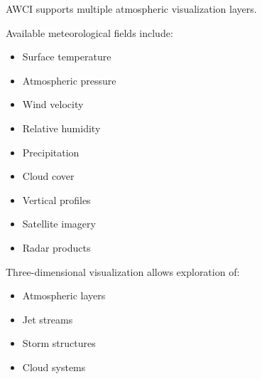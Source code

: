 AWCI supports multiple atmospheric visualization layers.


Available meteorological fields include:


\begin{itemize}

\item Surface temperature

\item Atmospheric pressure

\item Wind velocity

\item Relative humidity

\item Precipitation

\item Cloud cover

\item Vertical profiles

\item Satellite imagery

\item Radar products

\end{itemize}



Three-dimensional visualization allows exploration of:

\begin{itemize}

\item Atmospheric layers

\item Jet streams

\item Storm structures

\item Cloud systems

\end{itemize}
